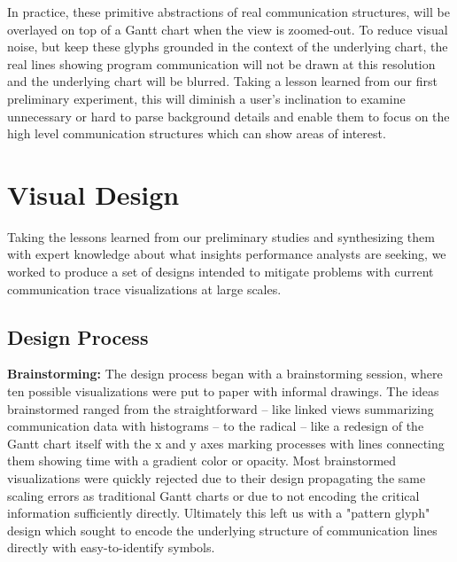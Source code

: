 In practice, these primitive abstractions of real communication structures, will be overlayed on top of a Gantt chart when the view is zoomed-out. To reduce visual noise, but keep these glyphs grounded in the context of the underlying chart, the real lines showing program communication will not be drawn at this resolution and the underlying chart will be blurred. Taking a lesson learned from our first preliminary experiment, this will diminish a user's inclination to examine unnecessary or hard to parse background details and enable them to focus on the high level communication structures which can show areas of interest.  


\section{Visual Design}
\label{sec:design}

Taking the lessons learned from our preliminary studies and synthesizing them with expert knowledge about what insights performance analysts are seeking, we worked to produce a set of designs intended to mitigate problems with current communication trace visualizations at large scales. 

\subsection{Design Process}

\textbf{Brainstorming:} The design process began with a brainstorming session, where ten possible visualizations were put to paper with informal drawings. The ideas brainstormed ranged from the straightforward -- like linked views summarizing communication data with histograms -- to the radical -- like a redesign of the Gantt chart itself with the x and y axes marking processes with lines connecting them showing time with a gradient color or opacity. Most brainstormed visualizations were quickly rejected due to their design propagating the same scaling errors as traditional Gantt charts or due to not encoding the critical information sufficiently directly. Ultimately this left us with a "pattern glyph" design which sought to encode the underlying structure of communication lines directly with easy-to-identify symbols.

